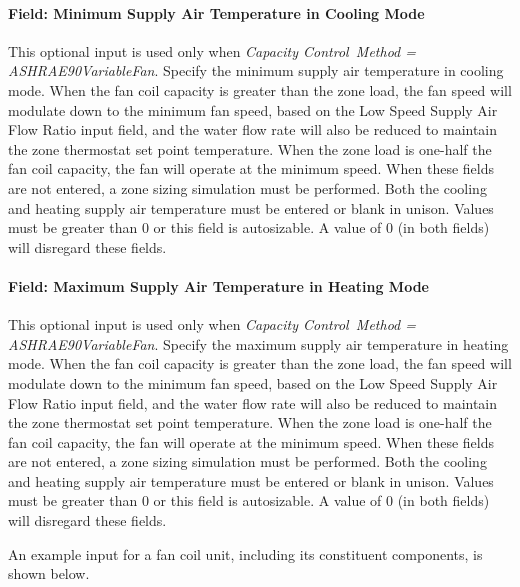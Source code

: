\paragraph{Field: Minimum Supply Air Temperature in Cooling Mode}\label{field-minimum-supply-air-temperature-in-cooling-mode}

This optional input is used only when \emph{Capacity Control~Method = ASHRAE90VariableFan}. Specify the minimum supply air temperature in cooling mode. When the fan coil capacity is greater than the zone load, the fan speed will modulate down to the minimum fan speed, based on the Low Speed Supply Air Flow Ratio input field, and the water flow rate will also be reduced to maintain the zone thermostat set point temperature. When the zone load is one-half the fan coil capacity, the fan will operate at the minimum speed. When these fields are not entered, a zone sizing simulation must be performed. Both the cooling and heating supply air temperature must be entered or blank in unison. Values must be greater than 0 or this field is autosizable. A value of 0 (in both fields) will disregard these fields.

\paragraph{Field: Maximum Supply Air Temperature in Heating Mode}\label{field-maximum-supply-air-temperature-in-heating-mode}

This optional input is used only when \emph{Capacity Control~Method = ASHRAE90VariableFan}. Specify the maximum supply air temperature in heating mode. When the fan coil capacity is greater than the zone load, the fan speed will modulate down to the minimum fan speed, based on the Low Speed Supply Air Flow Ratio input field, and the water flow rate will also be reduced to maintain the zone thermostat set point temperature. When the zone load is one-half the fan coil capacity, the fan will operate at the minimum speed. When these fields are not entered, a zone sizing simulation must be performed. Both the cooling and heating supply air temperature must be entered or blank in unison. Values must be greater than 0 or this field is autosizable. A value of 0 (in both fields) will disregard these fields.

An example input for a fan coil unit, including its constituent components, is shown below.

